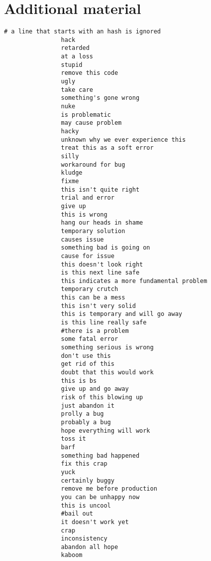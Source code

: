 \chapter{Additional material}


\begin{lstlisting}[caption={61 patterns for SATD detection}, label={lst:patterns61}]
                # a line that starts with an hash is ignored
                hack
                retarded
                at a loss
                stupid
                remove this code
                ugly
                take care
                something's gone wrong
                nuke
                is problematic
                may cause problem
                hacky
                unknown why we ever experience this
                treat this as a soft error
                silly
                workaround for bug
                kludge
                fixme
                this isn't quite right
                trial and error
                give up
                this is wrong
                hang our heads in shame
                temporary solution
                causes issue
                something bad is going on
                cause for issue
                this doesn't look right
                is this next line safe
                this indicates a more fundamental problem
                temporary crutch
                this can be a mess
                this isn't very solid
                this is temporary and will go away
                is this line really safe
                #there is a problem
                some fatal error
                something serious is wrong
                don't use this
                get rid of this
                doubt that this would work
                this is bs
                give up and go away
                risk of this blowing up
                just abandon it
                prolly a bug
                probably a bug
                hope everything will work
                toss it
                barf
                something bad happened
                fix this crap
                yuck
                certainly buggy
                remove me before production
                you can be unhappy now
                this is uncool
                #bail out
                it doesn't work yet
                crap
                inconsistency
                abandon all hope
                kaboom
\end{lstlisting}